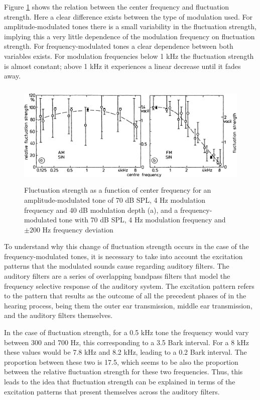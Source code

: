 Figure \ref{fig:flucstrenvscfreq} shows the relation between the center
frequency and fluctuation strength. Here a clear difference exists between the
type of modulation used. For amplitude-modulated tones there is a small
variability in the fluctuation strength, implying this a very little dependence
of the modulation frequency on fluctuation strength. For frequency-modulated
tones a clear dependence between both variables exists. For modulation
frequencies below 1 kHz the fluctuation strength is almost constant; above 1 kHz
it experiences a linear decrease until it fades away.

\begin{figure}
    \centering
    \includegraphics[height=5cm]
        {img/Fastl2007-FluctuationStrengthVsCenterFrequency}
    \caption{Fluctuation strength as a function of center frequency for an
        amplitude-modulated tone of 70 dB SPL, 4 Hz modulation frequency and 40
        dB modulation depth (a), and a frequency-modulated tone with 70 dB SPL,
        4 Hz modulation frequency and $\pm200$ Hz frequency deviation
        \cite[pp. 250]{Fastl2007Psychoacoustics}}
    \label{fig:flucstrenvscfreq}
\end{figure}

To understand why this change of fluctuation strength occurs in the case of the
frequency-modulated tones, it is necessary to take into account the excitation
patterns that the modulated sounds cause regarding auditory filters. The
auditory filters are a series of overlapping bandpass filters that model the
frequency selective response of the auditory system. The excitation pattern
refers to the pattern that results as the outcome of all the precedent phases of
in the hearing process, being them the outer ear transmission, middle ear
transmission, and the auditory filters themselves.

In the case of fluctuation strength, for a 0.5 kHz tone the frequency would vary
between 300 and 700 Hz, this corresponding to a 3.5 Bark interval. For a 8 kHz
these values would be 7.8 kHz and 8.2 kHz, leading to a 0.2 Bark interval. The
proportion between these two is 17.5, which seems to be also the proportion
between the relative fluctuation strength for these two frequencies. Thus, this
leads to the idea that fluctuation strength can be explained in terms of the
excitation patterns that present themselves across the auditory filters.

